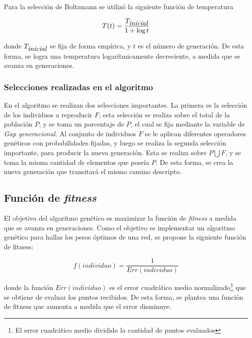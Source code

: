 \documentclass{article}
\begin{document}
Para la selección de Boltzmann se utilizó la siguiente función de temperatura

\begin{equation}
 T(t) = \frac{T_{\mbox{\emph{inicial}}}}{1 + \log t}
\end{equation}

donde $T_{\mbox{\emph{inicial}}}$ se fija de forma empírica, y $t$ es el número de generación. De esta forma, se logra una temperatura
logarítmicamente decreciente, a medida que se avanza en generaciones.

\subsubsection{Selecciones realizadas en el algoritmo}

En el algoritmo se realizan dos selecciones importantes. La primera es la selección de los individuos a reproducir $F$, esta selección
se realiza sobre el total de la población $P$, y se toma un porcentaje de $P$, el cual se fija mediante la variable de \emph{Gap generacional}. 
Al conjunto de individuos $F$ se le aplican diferentes operadores genéticos con probabilidades fijadas, y luego se realiza 
la segunda selección importante, para producir la nueva generación. Esta se realiza sobre $P \bigcup F$, y se toma la misma cantidad de elementos
que poseía $P$. De esta forma, se crea la nueva generación que transitará el mismo camino descripto.

\subsection{Función de \emph{fitness}}

El objetivo del algoritmo genético es maximizar la función de \emph{fitness} a medida que se avanza en generaciones. Como el objetivo es implementar 
un algoritmo genético para hallar los pesos óptimos de una red, se propone la siguiente función de fitness:

\begin{equation}
       f(individuo) = \frac{1}{Err(individuo)}
\end{equation}

donde la función $Err(individuo)$ es el error cuadrático medio normalizado\footnote{El error cuadrático medio dividido la cantidad de puntos evaluados} 
que se obtiene de evaluar los puntos recibidos. De esta forma, se plantea una función de fitness que aumenta a medida que el error disminuye.\\
\end{document}
